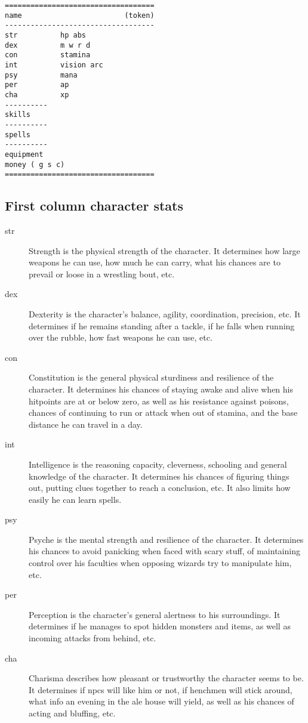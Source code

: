 \goodbreak
\begin{samepage} \begin{verbatim}
===================================
name                        (token)
-----------------------------------
str          hp abs
dex          m w r d
con          stamina
int          vision arc
psy          mana
per          ap
cha          xp
----------
skills
----------
spells
----------
equipment
money ( g s c)
===================================
\end{verbatim} \end{samepage}


\subsection*{First column character stats}

\begin{description}

\item[str] Strength is the physical strength of the character. It determines how large weapons he can use, how much he can carry, what his chances are to prevail or loose in a wrestling bout, etc.

\item[dex] Dexterity is the character's balance, agility, coordination, precision, etc. It determines if he remains standing after a tackle, if he falls when running over the rubble, how fast weapons he can use, etc.

\item[con] Constitution is the general physical sturdiness and resilience of the character. It determines his chances of staying awake and alive when his hitpoints are at or below zero, as well as his resistance against poisons, chances of continuing to run or attack when out of stamina, and the base distance he can travel in a day.

\item[int] Intelligence is the reasoning capacity, cleverness, schooling and general knowledge of the character. It determines his chances of figuring things out, putting clues together to reach a conclusion, etc. It also limits how easily he can learn spells.

\item[psy] Psyche is the mental strength and resilience of the character. It determines his chances to avoid panicking when faced with scary stuff, of maintaining control over his faculties when opposing wizards try to manipulate him, etc.

\item[per] Perception is the character's general alertness to his surroundings. It determines if he manages to spot hidden monsters and items, as well as incoming attacks from behind, etc.

\item[cha] Charisma describes how pleasant or trustworthy the character seems to be. It determines if npcs will like him or not, if henchmen will stick around, what info an evening in the ale house will yield, as well as his chances of acting and bluffing, etc.

\end{description}


